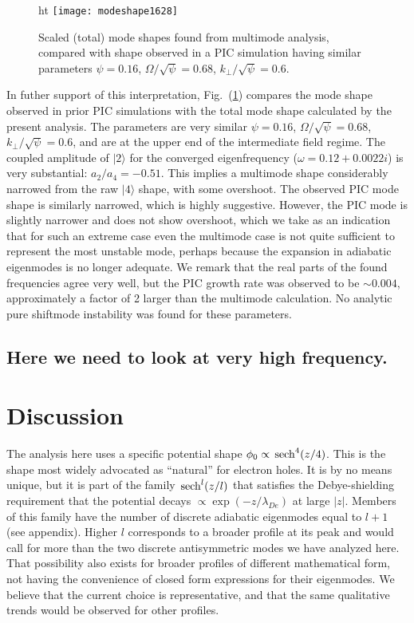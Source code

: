 \documentclass[12pt]{article}
\def\ket#1{|#1\rangle}
\def\sech{{\,\rm sech}}
\begin{document}
\begin{figure}ht
  \center  \texttt{[image: modeshape1628]}
  \caption{Scaled (total) mode shapes found from multimode analysis,
    compared with shape observed in a PIC simulation having similar
    parameters $\psi=0.16$, $\Omega/\sqrt{\psi}=0.68$,
$k_\perp/\sqrt{\psi}=0.6$.\label{piccomp}}
\end{figure}
In futher support of this interpretation, Fig.\ (\ref{piccomp})
compares the mode shape observed in prior PIC
simulations\cite{Hutchinson2019} with the total mode shape calculated
by the present analysis. The parameters are very similar $\psi=0.16$,
$\Omega/\sqrt{\psi}=0.68$, $k_\perp/\sqrt{\psi}=0.6$, and are at the
upper end of the intermediate field regime. The coupled amplitude of
$\ket{2}$ for the converged eigenfrequency ($\omega=0.12+0.0022i$) is
very substantial: $a_2/a_4=-0.51$. This implies a multimode shape
considerably narrowed from the raw $\ket{4}$ shape, with some
overshoot. The observed PIC mode shape is similarly narrowed, which is
highly suggestive. However, the PIC mode is slightly narrower and does
not show overshoot, which we take as an indication that for such an
extreme case even the multimode case is not quite sufficient to
represent the most unstable mode, perhaps because the expansion in
adiabatic eigenmodes is no longer adequate. We remark that the real
parts of the found frequencies agree very well, but the PIC growth
rate was observed to be $\sim 0.004$, approximately a factor of 2
larger than the multimode calculation. No analytic pure shiftmode
instability was found for these parameters.


\subsection*{Here we need to look at very high frequency.}

\section{Discussion}

The analysis here uses a specific potential shape
$\phi_0\propto \sech^4(z/4)$. This is the shape most widely advocated
as ``natural'' for electron holes. It is by no means unique, but it is
part of the family $\sech^l(z/l)$ that satisfies the Debye-shielding
requirement that the potential decays $\propto \exp(-z/\lambda_{De})$
at large $|z|$. Members of this family have the number of discrete
adiabatic eigenmodes equal to $l+1$ (see appendix). Higher $l$
corresponds to a broader profile at its peak and would call for more
than the two discrete antisymmetric modes we have analyzed here. That
possibility also exists for broader profiles of different mathematical
form, not having the convenience of closed form expressions for their
eigenmodes. We believe that the current choice is representative, and
that the same qualitative trends would be observed for other profiles.
\end{document}
